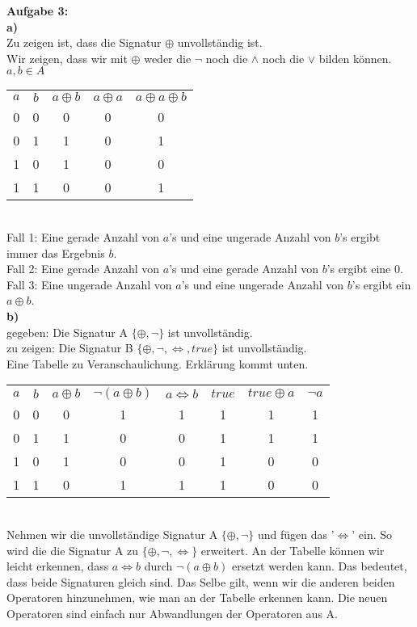 \documentclass[a4paper]{scrartcl}
\begin{document}
	\begin{flushleft}
		\textbf{Aufgabe 3:}\\
		\textbf{a)}\\
		Zu zeigen ist, dass die Signatur ${\oplus}$ unvollständig ist.\\[1em]
		Wir zeigen, dass wir mit $\oplus$ weder die $\neg$ noch die $\wedge$ noch die $\vee$ bilden können.\\
		$a,b\in A$\\[1em]	
		\begin{tabular}{|c|c|c|c|c|}
			$a$ & $b$ & $a\oplus b$ & $a\oplus a$ & $a\oplus a\oplus b$\\
			0 & 0 & 0 & 0 & 0\\
			0 & 1 & 1 & 0 & 1\\
			1 & 0 & 1 & 0 & 0\\
			1 & 1 & 0 & 0 & 1\\
		 \end{tabular}\\[1em]
		 Fall 1: Eine gerade Anzahl von $a$'s und eine ungerade Anzahl von $b$'s ergibt immer das Ergebnis $b$.\\
		 Fall 2: Eine gerade Anzahl von $a$'s und eine gerade Anzahl von $b$'s ergibt eine $0$.\\
		 Fall 3: Eine ungerade Anzahl von $a$'s und eine ungerade Anzahl von $b$'s ergibt ein $a\oplus b$.\\
		\textbf{b)}\\
		gegeben: Die Signatur A $\{\oplus,\neg\}$ ist unvollständig.\\
		zu zeigen: Die Signatur B $\{\oplus,\neg,\Leftrightarrow,true\}$ ist unvollständig.\\[1em]
		Eine Tabelle zu Veranschaulichung. Erklärung kommt unten.\\[1em]
		\begin{tabular}{|c|c|c|c|c|c|c|c|}
			$a$ & $b$ & $a\oplus b$ & $\neg(a\oplus b)$ & $a\Leftrightarrow b$ & $true$ & $true \oplus a$ & $\neg a$\\
			0 & 0 & 0 & 1 & 1 & 1 & 1 & 1\\
			0 & 1 & 1 & 0 & 0 & 1 & 1 & 1\\
			1 & 0 & 1 & 0 & 0 & 1 & 0 & 0\\
			1 & 1 & 0 & 1 & 1 & 1 & 0 & 0\\
		 \end{tabular}\\[1em]
		Nehmen wir die unvollständige Signatur A $\{ \oplus,\neg \}$ und fügen das '$\Leftrightarrow$' ein. So wird die die Signatur A zu $\{ \oplus,\neg,\Leftrightarrow \}$ erweitert. An der Tabelle können wir leicht erkennen, dass $a\Leftrightarrow b$ durch $\neg(a\oplus b)$ ersetzt werden kann. Das bedeutet, dass beide Signaturen gleich sind. Das Selbe gilt, wenn wir die anderen beiden Operatoren hinzunehmen, wie man an der Tabelle erkennen kann. Die neuen Operatoren sind einfach nur Abwandlungen der Operatoren aus A.\\  
 	\end{flushleft}
\end{document}

